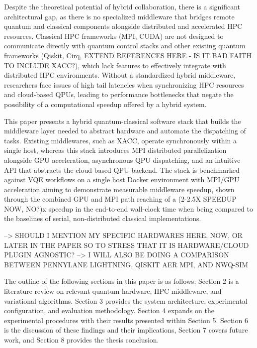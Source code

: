     Despite the theoretical potential of hybrid collaboration, there is a significant architectural gap, as  
    there is no specialized middleware that bridges remote quantum and classical components alongside distributed and accelerated HPC resources. Classical HPC frameworks (MPI, CUDA)
    are not designed to communicate directly with quantum control stacks and other existing quantum frameworks (Qiskit, Cirq, EXTEND REFERENCES HERE - IS IT BAD FAITH TO INCLUDE XACC?), which  
    lack features to effectively integrate with distributed HPC environments. Without a standardized hybrid middleware, researchers face issues of high tail latencies when synchronizing
    HPC resources and cloud-based QPUs, leading to performance bottlenecks that negate the possibility of a computational speedup offered by a
    hybrid system. 

    This paper presents a hybrid quantum-classical software stack that builds the middleware layer needed
    to abstract hardware and automate the dispatching of tasks. Existing middlewares, such as XACC, operate synchronously within a single host, whereas this stack introduces MPI distributed parallelization alongside 
    GPU acceleration, asynchronous QPU dispatching, and an intuitive API that abstracts the cloud-based QPU backend. The stack is benchmarked against VQE workflows 
    on a single host Docker environment with MPI/GPU acceleration aiming to demonstrate measurable middleware speedup, shown through the combined GPU and MPI path reaching of a (2-2.5X SPEEDUP NOW, NO?)x 
    speedup in the end-to-end wall-clock time when being compared to the baselines of serial, non-distributed classical implementations. 

    --> SHOULD I MENTION MY SPECIFIC HARDWARES HERE, NOW, OR LATER IN THE PAPER SO TO STRESS THAT IT IS HARDWARE/CLOUD PLUGIN AGNOSTIC?
    --> I WILL ALSO BE DOING A COMPARISON BETWEEN PENNYLANE LIGHTNING, QISKIT AER MPI, AND NWQ-SIM 

    The outline of the following sections in this paper is as follows: Section 2 is a literature review on relevant quantum hardware, HPC middleware, and variational algorithms. Section 3
    provides the system architecture, experimental configuration, and evaluation methodology. Section 4 expands on the experimental procedures with their results presented within Section 5. 
    Section 6 is the discussion of these findings and their implications, Section 7 covers future work, and Section 8 provides the thesis conclusion. 